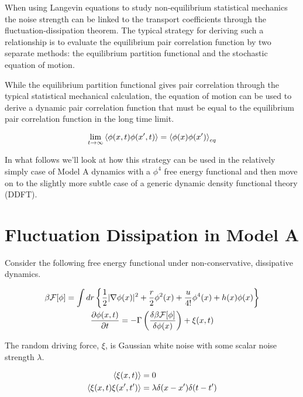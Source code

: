When using Langevin equations to study non-equilibrium statistical mechanics the noise strength can be linked to the transport coefficients through the fluctuation-dissipation theorem. The typical strategy for 
deriving such a relationship is to evaluate the equilibrium pair correlation function by two separate methods: the equilibrium partition functional and the stochastic equation of motion. 

While the equilibrium partition functional gives pair correlation through the typical statistical mechanical calculation, the equation of motion can be used to derive a dynamic pair correlation function that must be equal to the equilibrium pair correlation function in the long time limit. 

\begin{equation}
	\lim_{t \rightarrow \infty} \left\langle \phi(x, t) \phi(x^\prime, t) \right\rangle = \left\langle\phi(x)\phi(x^\prime) \right\rangle_{eq}
\end{equation}

In what follows we'll look at how this strategy can be used in the relatively simply case of Model A dynamics with a $\phi^4$ free energy functional and then move on to the slightly more subtle case of a generic dynamic density functional theory (DDFT).

\section{Fluctuation Dissipation in Model A}

Consider the following free energy functional under non-conservative, dissipative dynamics. 

\begin{gather}
\beta \mathcal{F}[\phi] = \int dr \left\lbrace \frac{1}{2}\vert \nabla \phi(x) \vert^2 + \frac{r}{2}\phi^2(x) + \frac{u}{4!}\phi^4(x)  + h(x)\phi(x)\right\rbrace \\
\frac{\partial \phi(x,t)}{\partial t} = -\Gamma \left(\frac{\delta \beta \mathcal{F}[\phi]}{\delta \phi(x)}\right) + \xi(x, t) 
\end{gather}

The random driving force, $\xi$, is Gaussian white noise with some scalar noise strength $\lambda$.

\begin{align}
\left\langle \xi (x, t) \right\rangle &= 0 \\
\left\langle \xi (x, t) \xi(x^\prime, t^\prime) \right\rangle  &= \lambda \delta(x - x^\prime) \delta (t - t^\prime)
\end{align}

